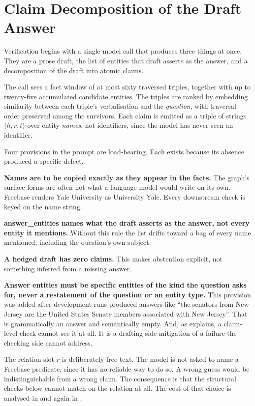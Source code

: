 \section{Claim Decomposition of the Draft Answer}\label{sec:claim-decomposition}

Verification begins with a single model call that
produces three things at once. They are a prose draft, the list of entities that
draft asserts as the answer, and a decomposition of the draft into atomic
claims.

The call sees a fact window of at most sixty traversed triples, together with up
to twenty-five accumulated candidate entities. The triples are ranked by
embedding similarity between each triple's verbalisation and the
\emph{question}, with traversal order preserved among the survivors. Each claim
is emitted as a triple of strings $\langle h, r, t \rangle$ over entity
\emph{names}, not identifiers, since the model has never seen an identifier.

Four provisions in the prompt are load-bearing. Each exists because its absence
produced a specific defect.

\textbf{Names are to be copied exactly as they appear in the facts.} The graph's
surface forms are often not what a language model would write on its own.
Freebase renders Yale University as \textsf{University Yale}. Every downstream
check is keyed on the name string.

\textbf{\textsf{answer\_entities} names what the draft asserts as the answer,
not every entity it mentions.} Without this rule the list drifts toward a bag of
every name mentioned, including the question's own subject.

\textbf{A hedged draft has zero claims.} This makes abstention explicit, not
something inferred from a missing answer.

\textbf{Answer entities must be specific entities of the kind the question asks
for, never a restatement of the question or an entity type.} This provision was
added after development runs produced answers like ``the senators from New
Jersey are the United States Senate members associated with New Jersey''. That
is grammatically an answer and semantically empty. And, as
 explains, a claim-level check cannot see it at
all. It is a drafting-side mitigation of a failure the checking side cannot
address.

The relation slot $r$ is deliberately free text. The model is not asked to name
a Freebase predicate, since it has no reliable way to do so. A wrong guess would
be indistinguishable from a wrong claim. The consequence is that the structural
checks below cannot match on the relation at all. The cost of that choice is
analysed in  and again in
.

